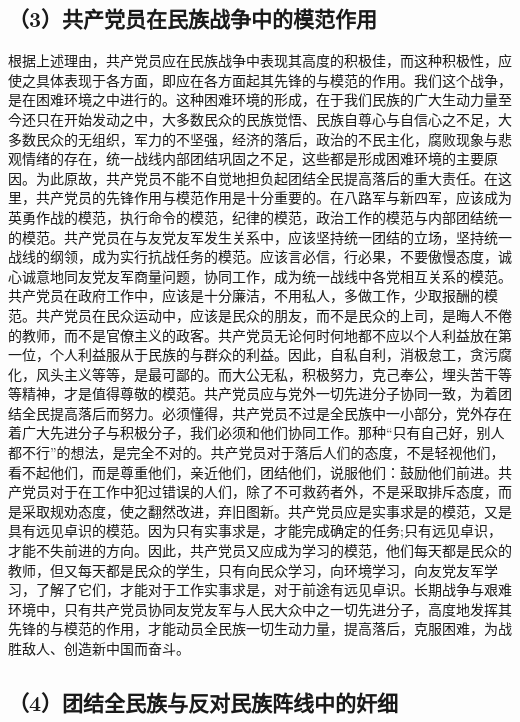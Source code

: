 \subsection{（3）共产党员在民族战争中的模范作用}

根据上述理由，共产党员应在民族战争中表现其高度的积极佳，而这种积极性，应使之具体表现于各方面，即应在各方面起其先锋的与模范的作用。我们这个战争，是在困难环境之中进行的。这种困难环境的形成，在于我们民族的广大生动力量至今还只在开始发动之中，大多数民众的民族觉悟、民族自尊心与自信心之不足，大多数民众的无组织，军力的不坚强，经济的落后，政治的不民主化，腐败现象与悲观情绪的存在，统一战线内部团结巩固之不足，这些都是形成困难环境的主要原因。为此原故，共产党员不能不自觉地担负起团结全民提高落后的重大责任。在这里，共产党员的先锋作用与模范作用是十分重要的。在八路军与新四军，应该成为英勇作战的模范，执行命令的模范，纪律的模范，政治工作的模范与内部团结统一的模范。共产党员在与友党友军发生关系中，应该坚持统一团结的立场，坚持统一战线的纲领，成为实行抗战任务的模范。应该言必信，行必果，不要傲慢态度，诚心诚意地同友党友军商量问题，协同工作，成为统一战线中各党相互关系的模范。共产党员在政府工作中，应该是十分廉洁，不用私人，多做工作，少取报酬的模范。共产党员在民众运动中，应该是民众的朋友，而不是民众的上司，是晦人不倦的教师，而不是官僚主义的政客。共产党员无论何时何地都不应以个人利益放在第一位，个人利益服从于民族的与群众的利益。因此，自私自利，消极怠工，贪污腐化，风头主义等等，是最可鄙的。而大公无私，积极努力，克己奉公，埋头苦干等等精神，才是值得尊敬的模范。共产党员应与党外一切先进分子协同一致，为着团结全民提高落后而努力。必须懂得，共产党员不过是全民族中一小部分，党外存在着广大先进分子与积极分子，我们必须和他们协同工作。那种“只有自己好，别人都不行”的想法，是完全不对的。共产党员对于落后人们的态度，不是轻视他们，看不起他们，而是尊重他们，亲近他们，团结他们，说服他们：鼓励他们前进。共产党员对于在工作中犯过错误的人们，除了不可救药者外，不是采取排斥态度，而是采取规劝态度，使之翻然改进，弃旧图新。共产党员应是实事求是的模范，又是具有远见卓识的模范。因为只有实事求是，才能完成确定的任务;只有远见卓识，才能不失前进的方向。因此，共产党员又应成为学习的模范，他们每天都是民众的教师，但又每天都是民众的学生，只有向民众学习，向环境学习，向友党友军学习，了解了它们，才能对于工作实事求是，对于前途有远见卓识。长期战争与艰难环境中，只有共产党员协同友党友军与人民大众中之一切先进分子，高度地发挥其先锋的与模范的作用，才能动员全民族一切生动力量，提高落后，克服困难，为战胜敌人、创造新中国而奋斗。

\subsection{（4）团结全民族与反对民族阵线中的奸细}

